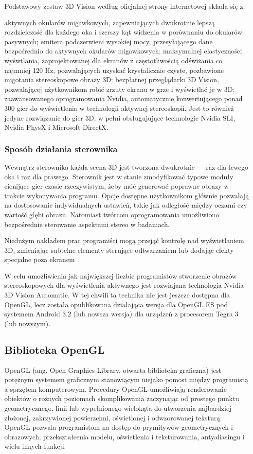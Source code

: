 Podstawowy zestaw 3D Vision według oficjalnej strony internetowej \cite{3dVisionInfo} składa się z: 
\begin{itemize}
\itemi aktywnych okularów migawkowych, zapewniających dwukrotnie lepszą rozdzielczość dla każdego oka i szerszy kąt widzenia w porównaniu do okularów pasywnych;
\itemi emitera podczerwieni wysokiej mocy, przesyłającego dane bezpośrednio do aktywnych okularów migawkowych;
\itemi maksymalnej elastyczności wyśwtlania, zaprojektowanej dla ekranów z częstotliwością odświżania co najmniej 120 Hz, pozwalających uzyskać krystalicznie czyste, pozbawione migotania stereoskopowe obrazy 3D;
\itemi bezpłatnej przeglądarki 3D Vision, pozwalającej użytkownikom robić zrzuty ekranu w grze i wyświetlać je w 3D;
\itemi zaawansowanego oprogramowania Nvidia, automatycznie konwertującego ponad 300 gier do wyświetlenia w technologii aktywnej stereoskopii. Jest to również jedyne rozwiązanie do gier 3D, w pełni obsługujujące technologie Nvidia SLI, Nvidia PhysX i Microsoft DirectX.
\end{itemize}

\subsubsection{Sposób działania sterownika}
Wewnątrz sterownika każda scena 3D jest tworzona dwukrotnie --- raz dla lewego oka i raz dla prawego. Sterownik jest w stanie zmodyfikować typowe moduły cienijące gier czasie rzeczywistym, żeby móć generować poprawne obrazy w trakcie wykonywania programu. Opcje dostępne użytkownikom głównie pozwalają na dostosowanie indywidualnych ustawień, takie jak odległość między oczami czy wartość głębi obrazu. Natomiast twórcom oprogramowania umożliwiono bezpośrednie sterowanie aspektami stereo w badaniach. 

Niedużym nakładem prac programiści mogą przejąć kontrolę nad wyświetlaniem 3D, zmieniając subtelne elementy sterujące odtwarzaniem lub dodając efekty specjalne poza ekranem \cite{3dVisionInfo}. 

W celu umożliwienia jak największej liczbie programistów stworzenie obrazów stereoskopowych dla wyświetlenia aktywnego jest rozwiajana technologia Nvidia 3D Vision Automatic. W tej chwili ta technika nie jest jeszcze dostępna dla OpenGL, lecz została opublikowana działająca wersja dla OpenGL ES pod systemem Android 3.2 (lub nowsza wersja) dla urządzeń z procesorem Tegra 3 (lub nowszym).

\subsection{Biblioteka OpenGL}
OpenGL (ang. Open Graphics Library, otwarta biblioteka graficzna) jest potężnym systemem graficznym stanowiącym niejako pomost między programistą a sprzętem komputerowym. Procedury OpenGL umożliwiają renderowanie obiektów o rożnych poziomach skomplikowania zaczynając od prostego punktu geometrycznego, linii lub wypełnionego wielokąta do utworzenia najbardziej złożonej, zakrzywionej powierzchni, oświetlonej i odwzorowanej teksturą. OpenGL pozwala programistom na dostęp do prymitywów geometrycznych i obrazowych, przekształcenia modelu, oświetlenia i teksturowania, antyaliasingu i wielu innych funkcji. 

